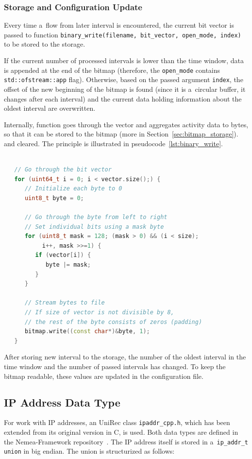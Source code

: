 \subsubsection{Storage and Configuration Update}
Every time a~flow from later interval is encountered, the current bit vector
is passed to function \texttt{binary\_write(filename, bit\_vector, open\_mode, index)}
to be stored to the storage.

If the current number of processed intervals is lower than the time window, data is appended
at the end of the bitmap (therefore, the \texttt{open\_mode} contains \texttt{std::ofstream::app} flag).
Otherwise, based on the passed argument \texttt{index}, the offset of the new beginning of the bitmap
is found (since it is a~circular buffer, it changes after each interval) and the current data
holding information about the oldest interval are overwritten.

Internally, function goes through the vector and aggregates activity data to bytes, so that it can be
stored to the bitmap (more in Section~\ref{sec:bitmap_storage}). and cleared. The principle is
illustrated in pseudocode~\ref{lst:binary_write}.

\begin{lstlisting}[label={lst:binary_write},language=C++]

   // Go through the bit vector
   for (uint64_t i = 0; i < vector.size();) {
      // Initialize each byte to 0
      uint8_t byte = 0;

      // Go through the byte from left to right
      // Set individual bits using a mask byte
      for (uint8_t mask = 128; (mask > 0) && (i < size);
           i++, mask >>=1) {
         if (vector[i]) {
            byte |= mask;
         }
      }

      // Stream bytes to file
      // If size of vector is not divisible by 8,
      // the rest of the byte consists of zeros (padding)
      bitmap.write((const char*)&byte, 1);
   }
\end{lstlisting}

After storing new interval to the storage, the number of the oldest interval in the time window
and the number of passed intervals has changed. To keep the bitmap readable,
these values are updated in the configuration file.

\subsection{IP Address Data Type}
For work with IP addresses, an UniRec class \texttt{ipaddr\_cpp.h}, which has been extended
from its original version in C, is used. Both data types are defined in the Nemea-Framework
repository~\cite{nemeaframework}.
The IP address itself is stored in a~\texttt{ip\_addr\_t union} in big endian.
The union is structurized as follows:

